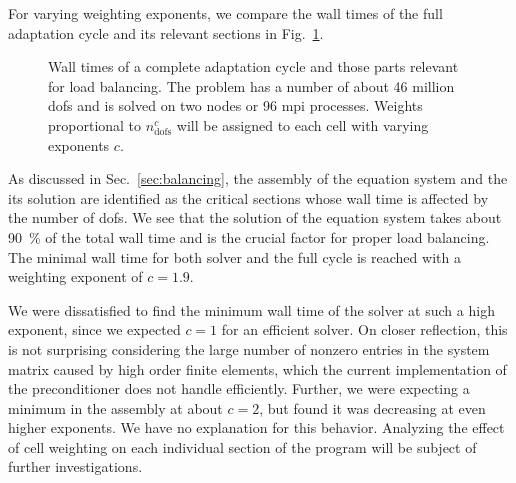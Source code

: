 
For varying weighting exponents, we compare the wall times of the full adaptation cycle and its relevant sections
in Fig.~\ref{fig:weights}.

\begin{figure}
\centering

\caption[Wall times for load balancing with varying weighting exponents.]{Wall times of a complete adaptation cycle and those parts relevant for load balancing. The problem has a number of about 46 million \glspl{dof} and is solved on two nodes or 96 \gls{mpi} processes. Weights proportional to $n_\text{dofs}^c$ will be assigned to each cell with varying exponents $c$.}
\label{fig:weights}
\end{figure}

As discussed in Sec.~\ref{sec:balancing}, the assembly of the equation system and the its solution are identified as the critical sections whose wall time is affected by the number of \glspl{dof}. We see that the solution of the equation system takes about \SI{90}{\percent} of the total wall time and is the crucial factor for proper load balancing. The minimal wall time for both solver and the full cycle is reached with a weighting exponent of $c = 1.9$.

We were dissatisfied to find the minimum wall time of the solver at such a high exponent, since we expected $c = 1$ for an efficient solver.
On closer reflection, this is not surprising considering the large number of nonzero entries in the system matrix caused by high order finite elements, which the current implementation of the preconditioner does not handle efficiently.
Further, we were expecting a minimum in the assembly at about $c = 2$, but found it was decreasing at even higher exponents. We have no explanation for this behavior. Analyzing the effect of cell weighting on each individual section of the program
will be subject of further investigations.

